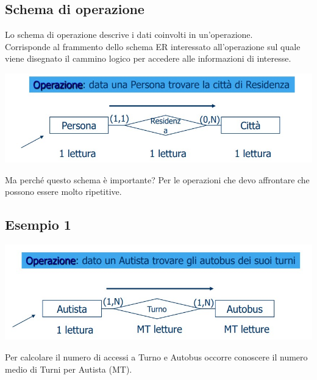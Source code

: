 \subsection{Schema di operazione}
Lo schema di operazione descrive i dati coinvolti in un'operazione.\\
Corrisponde al frammento dello schema ER interessato all'operazione sul quale viene disegnato il cammino logico per accedere alle informazioni di interesse.\\
\begin{center}
    \includegraphics[scale=0.675]{chaptersLezioniSara/img/PLog_intro5.jpg}
\end{center}
Ma perché questo schema è importante? Per le operazioni che devo affrontare che possono essere molto ripetitive.

\subsection{Esempio 1}
\begin{center}
    \includegraphics[scale=0.675]{chaptersLezioniSara/img/PLog_intro_es1.jpg}
\end{center}
Per calcolare il numero di accessi a Turno e Autobus occorre conoscere il numero medio di Turni per Autista (MT).

